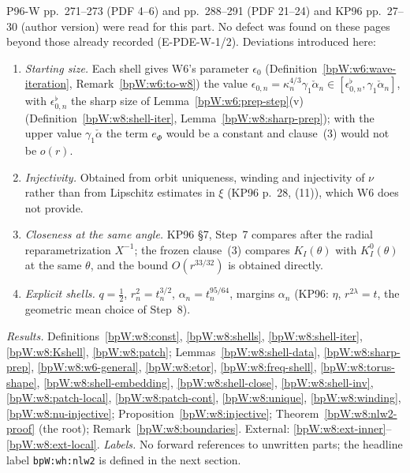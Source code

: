 \begin{remark}\label{bpW:w8:deviations}
P96-W pp.~271--273 (PDF 4--6) and pp.~288--291 (PDF 21--24) and KP96 pp.~27--30 (author version) were read for this part. No defect was found
on these pages beyond those already recorded (E-PDE-W-1/2). Deviations introduced here:
\begin{enumerate}[label=(\alph*)]
\item \emph{Starting size.} Each shell gives W6's parameter $\epsilon_0$ (Definition~\ref{bpW:w6:wave-iteration},
  Remark~\ref{bpW:w6:to-w8}) the value $\epsilon_{0,n}=\kappa_n^{4/3}\gamma_1\check\alpha_n\in[\epsilon^\flat_{0,n},\gamma_1\check\alpha_n]$, with
  $\epsilon^\flat_{0,n}$ the sharp size of Lemma~\ref{bpW:w6:prep-step}(v) (Definition~\ref{bpW:w8:shell-iter}, Lemma~\ref{bpW:w8:sharp-prep}); with
  the upper value $\gamma_1\check\alpha$ the term $e_\Phi$ would be a constant and clause~(3) would not be $o(r)$.
\item \emph{Injectivity.} Obtained from orbit uniqueness, winding and injectivity of $\nu$ rather than from Lipschitz estimates in $\xi$
  (KP96 p.~28, (11)), which W6 does not provide.
\item \emph{Closeness at the same angle.} KP96 \S7, Step~7 compares after the radial reparametrization $X^{-1}$; the frozen clause~(3)
  compares $K_I(\theta)$ with $K^0_I(\theta)$ at the same $\theta$, and the bound $O(r^{33/32})$ is obtained directly.
\item \emph{Explicit shells.} $q=\frac12$, $r_n^2=t_n^{3/2}$, $\alpha_n=t_n^{95/64}$, margins $\alpha_n$ (KP96: $\eta$, $r^{2\lambda}=t$, the geometric
  mean choice of Step~8).
\end{enumerate}
\emph{Results.} Definitions~\ref{bpW:w8:const}, \ref{bpW:w8:shells}, \ref{bpW:w8:shell-iter}, \ref{bpW:w8:Kshell},
\ref{bpW:w8:patch}; Lemmas~\ref{bpW:w8:shell-data}, \ref{bpW:w8:sharp-prep}, \ref{bpW:w8:w6-general}, \ref{bpW:w8:etor},
\ref{bpW:w8:freq-shell}, \ref{bpW:w8:torus-shape}, \ref{bpW:w8:shell-embedding}, \ref{bpW:w8:shell-close}, \ref{bpW:w8:shell-inv},
\ref{bpW:w8:patch-local}, \ref{bpW:w8:patch-cont}, \ref{bpW:w8:unique}, \ref{bpW:w8:winding}, \ref{bpW:w8:nu-injective};
Proposition~\ref{bpW:w8:injective}; Theorem~\ref{bpW:w8:nlw2-proof} (the root); Remark~\ref{bpW:w8:boundaries}. External:
\ref{bpW:w8:ext-inner}--\ref{bpW:w8:ext-local}.
\emph{Labels.} No forward references to unwritten parts; the headline label \texttt{bpW:wh:nlw2} is defined in the next section.
\end{remark}
